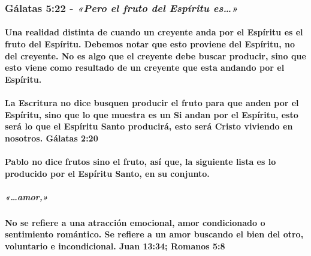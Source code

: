 \documentclass[11a pt,twoside]{article}
\newcommand{\scripture}[1]{%
  {\fontsize{12pt}{16pt}\selectfont\ScriptureFont\itshape #1}%
}
\let\oldsubsubsection\subsubsection
\renewcommand{\subsubsection}{\needspace{4\baselineskip}\oldsubsubsection}
\let\oldparagraph\paragraph
\renewcommand{\paragraph}{\needspace{3\baselineskip}\oldparagraph}
\let\oldsubparagraph\subparagraph
\renewcommand{\subparagraph}{\needspace{2\baselineskip}\oldsubparagraph}
\begin{document}
\subsubsection{\texorpdfstring{Gálatas 5:22 -
\scripture{«Pero el fruto del Espíritu es…»}}{Gálatas 5:22 - }}\label{guxe1latas-522---pero-el-fruto-del-espuxedritu-es}

\paragraph{Una realidad distinta de cuando un creyente anda por el
Espíritu es el fruto del Espíritu. Debemos notar que esto proviene del
Espíritu, no del creyente. No es algo que el creyente debe buscar
producir, sino que esto viene como resultado de un creyente que esta
andando por el
Espíritu.}\label{una-realidad-distinta-de-cuando-un-creyente-anda-por-el-espuxedritu-es-el-fruto-del-espuxedritu.-debemos-notar-que-esto-proviene-del-espuxedritu-no-del-creyente.-no-es-algo-que-el-creyente-debe-buscar-producir-sino-que-esto-viene-como-resultado-de-un-creyente-que-esta-andando-por-el-espuxedritu.}

\paragraph{La Escritura no dice busquen producir el fruto para que anden
por el Espíritu, sino que lo que muestra es un Si andan por el Espíritu,
esto será lo que el Espíritu Santo producirá, esto será Cristo viviendo
en nosotros. Gálatas
2:20}\label{la-escritura-no-dice-busquen-producir-el-fruto-para-que-anden-por-el-espuxedritu-sino-que-lo-que-muestra-es-un-si-andan-por-el-espuxedritu-esto-seruxe1-lo-que-el-espuxedritu-santo-produciruxe1-esto-seruxe1-cristo-viviendo-en-nosotros.-guxe1latas-220}

\paragraph{Pablo no dice frutos sino el fruto, así que, la siguiente
lista es lo producido por el Espíritu Santo, en su
conjunto.}\label{pablo-no-dice-frutos-sino-el-fruto-asuxed-que-la-siguiente-lista-es-lo-producido-por-el-espuxedritu-santo-en-su-conjunto.}

\subparagraph{\texorpdfstring{\scripture{«…amor,»}}{}}\label{amor}

\paragraph{No se refiere a una atracción emocional, amor condicionado o
sentimiento romántico. Se refiere a un amor buscando el bien del otro,
voluntario e incondicional. Juan 13:34; Romanos
5:8}\label{no-se-refiere-a-una-atracciuxf3n-emocional-amor-condicionado-o-sentimiento-romuxe1ntico.-se-refiere-a-un-amor-buscando-el-bien-del-otro-voluntario-e-incondicional.-juan-1334-romanos-58}
\end{document}
